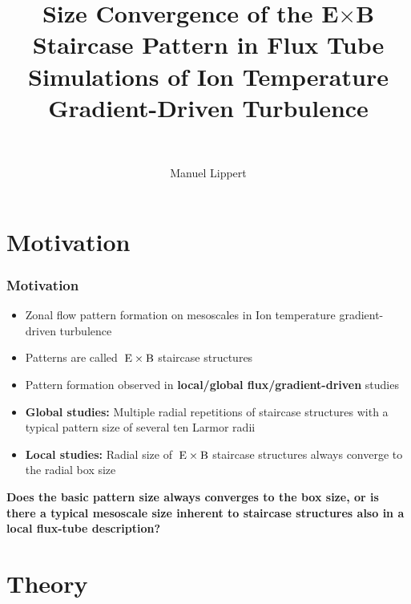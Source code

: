 \documentclass[compress,aspectratio=1610,noflama]{beamer}
\title{Size Convergence of the E$\times$B \\ Staircase Pattern in Flux Tube \\ Simulations of Ion
Temperature \\ Gradient-Driven Turbulence}
\subtitle{~}
\author{Manuel Lippert}
\institute{Theoretical Physics V}
\begin{document}
	\maketitle

	\section*{Motivation}
	\begin{frame}
		\frametitle{Motivation}

		\begin{center}
			\begin{itemize}
				\item <2-> Zonal flow pattern formation on mesoscales in Ion temperature gradient-driven turbulence 
				\item <3-> Patterns are called $\mathrm{\:E}\times\mathrm{B}$ staircase structures
				\item <4-> Pattern formation observed in \textbf{local/global flux/gradient-driven} studies
			\end{itemize}
		\end{center}
		\bigskip
		\begin{center}
			\begin{itemize}
				\item <5-> \textbf{Global studies:} Multiple radial repetitions of staircase structures with a typical pattern size of several ten Larmor radii
				\item <6-> \textbf{Local studies:} Radial size of $\mathrm{\:E}\times\mathrm{B}$ staircase structures always converge to the radial box size
			\end{itemize}
			\bigskip
			 \textbf{Does the basic pattern size always converges to the box size, or is there a typical mesoscale size inherent to staircase structures also in a local flux-tube description?}
		\end{center}
	\end{frame}

	\section*{Theory}
\end{document}
